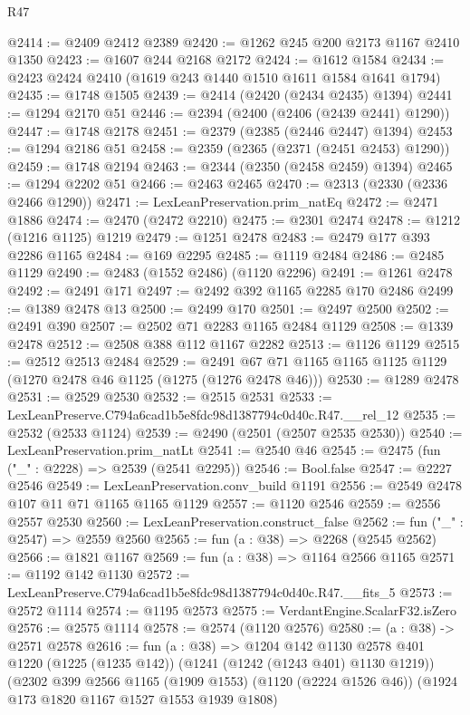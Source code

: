 \begin{lexlean}{R47}
\begin{coremodule}
@2414 := @2409 @2412 @2389
@2420 := @1262 @245 @200 @2173 @1167 @2410 @1350
@2423 := @1607 @244 @2168 @2172
@2424 := @1612 @1584
@2434 := @2423 @2424 @2410 (@1619 @243 @1440 @1510 @1611 @1584 @1641 @1794)
@2435 := @1748 @1505
@2439 := @2414 (@2420 (@2434 @2435) @1394)
@2441 := @1294 @2170 @51
@2446 := @2394 (@2400 (@2406 (@2439 @2441) @1290))
@2447 := @1748 @2178
@2451 := @2379 (@2385 (@2446 @2447) @1394)
@2453 := @1294 @2186 @51
@2458 := @2359 (@2365 (@2371 (@2451 @2453) @1290))
@2459 := @1748 @2194
@2463 := @2344 (@2350 (@2458 @2459) @1394)
@2465 := @1294 @2202 @51
@2466 := @2463 @2465
@2470 := @2313 (@2330 (@2336 @2466 @1290))
@2471 := LexLeanPreservation.prim_natEq
@2472 := @2471 @1886
@2474 := @2470 (@2472 @2210)
@2475 := @2301 @2474
@2478 := @1212 (@1216 @1125) @1219
@2479 := @1251 @2478
@2483 := @2479 @177 @393 @2286 @1165
@2484 := @169 @2295
@2485 := @1119 @2484
@2486 := @2485 @1129
@2490 := @2483 (@1552 @2486) (@1120 @2296)
@2491 := @1261 @2478
@2492 := @2491 @171
@2497 := @2492 @392 @1165 @2285 @170 @2486
@2499 := @1389 @2478 @13
@2500 := @2499 @170
@2501 := @2497 @2500
@2502 := @2491 @390
@2507 := @2502 @71 @2283 @1165 @2484 @1129
@2508 := @1339 @2478
@2512 := @2508 @388 @112 @1167 @2282
@2513 := @1126 @1129
@2515 := @2512 @2513 @2484
@2529 := @2491 @67 @71 @1165 @1165 @1125 @1129 (@1270 @2478 @46 @1125 (@1275 (@1276 @2478 @46)))
@2530 := @1289 @2478
@2531 := @2529 @2530
@2532 := @2515 @2531
@2533 := LexLeanPreserve.C794a6cad1b5e8fdc98d1387794c0d40c.R47.__rel_12
@2535 := @2532 (@2533 @1124)
@2539 := @2490 (@2501 (@2507 @2535 @2530))
@2540 := LexLeanPreservation.prim_natLt
@2541 := @2540 @46
@2545 := @2475 (fun ("_" : @2228) => @2539 (@2541 @2295))
@2546 := Bool.false
@2547 := @2227 @2546
@2549 := LexLeanPreservation.conv_build @1191
@2556 := @2549 @2478 @107 @11 @71 @1165 @1165 @1129
@2557 := @1120 @2546
@2559 := @2556 @2557 @2530
@2560 := LexLeanPreservation.construct_false
@2562 := fun ("_" : @2547) => @2559 @2560
@2565 := fun (a : @38) => @2268 (@2545 @2562)
@2566 := @1821 @1167
@2569 := fun (a : @38) => @1164 @2566 @1165
@2571 := @1192 @142 @1130
@2572 := LexLeanPreserve.C794a6cad1b5e8fdc98d1387794c0d40c.R47.__fits_5
@2573 := @2572 @1114
@2574 := @1195 @2573
@2575 := VerdantEngine.ScalarF32.isZero
@2576 := @2575 @1114
@2578 := @2574 (@1120 @2576)
@2580 := (a : @38) -> @2571 @2578
@2616 := fun (a : @38) =>
  @1204
    @142
    @1130
    @2578
    @401
    @1220
    (@1225 (@1235 @142))
    (@1241 (@1242 (@1243 @401) @1130 @1219))
    (@2302
      @399
      @2566
      @1165
      (@1909 @1553)
      (@1120 (@2224 @1526 @46))
      (@1924 @173 @1820 @1167 @1527 @1553 @1939 @1808)

\end{coremodule}
\end{lexlean}
